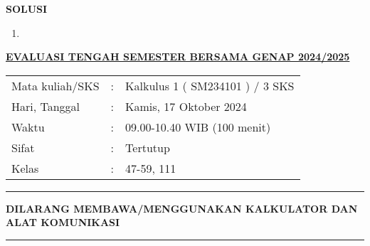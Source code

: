 \documentclass[10pt,openany,a4paper]{article}
\renewcommand{\headrulewidth}{0pt}
\renewcommand{\footrulewidth}{0pt}
\begin{document}


\newpage
{}
{\centering\textbf{SOLUSI}}
\renewcommand{\arraystretch}{1.5}
\renewcommand{\headrulewidth}{1pt}
\begin{enumerate}
    \item
\end{enumerate}

\newpage
\renewcommand{\arraystretch}{1}
\fancyhead{}
\fancyfoot{}
\fancyhead[r]{}
\renewcommand{\headrulewidth}{0pt}
\renewcommand{\footrulewidth}{0pt}
\begin{center}
    {\underline{\textbf{\MakeUppercase{Evaluasi Tengah Semester Bersama Genap 2024/2025}}}}
\end{center}

\begin{center}
    \begin{tabular}{lcl}
        Mata kuliah/SKS & : & Kalkulus 1 ( SM234101 ) / 3 SKS \\
        Hari, Tanggal   & : & Kamis, 17 Oktober 2024          \\
        Waktu           & : & 09.00-10.40 WIB (100 menit)     \\
        Sifat           & : & Tertutup                        \\
        Kelas           & : & 47-59, 111
    \end{tabular}
\end{center}

\noindent\rule{\textwidth}{2.pt}

\setlength{\parindent}{5pt}
\setlength{\parindent}{5pt}
\setlength{\parindent}{5pt}
\par \textbf{\MakeUppercase{dilarang membawa/menggunakan kalkulator dan alat komunikasi}}
\par {}
\noindent\rule{\textwidth}{2.pt}
\end{document}

